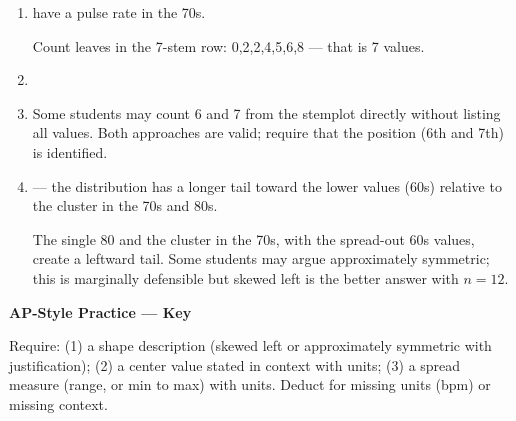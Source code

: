 \documentclass[10pt]{article}
\begin{document}
\begin{enumerate}[leftmargin=1.5em, itemsep=10pt]

  \item {} have a pulse rate in the 70s.

  \begin{teachernote}
  Count leaves in the 7-stem row: 0,2,2,4,5,6,8 — that is 7 values.
  \end{teachernote}

  \item {}

  \item {}

  \begin{teachernote}
  Some students may count 6 and 7 from the stemplot directly without listing
  all values. Both approaches are valid; require that the position (6th and 7th)
  is identified.
  \end{teachernote}

  \item {} --- the distribution has a longer tail toward the lower values
        (60s) relative to the cluster in the 70s and 80s.

  \begin{teachernote}
  The single 80 and the cluster in the 70s, with the spread-out 60s values, create
  a leftward tail. Some students may argue approximately symmetric; this is marginally
  defensible but skewed left is the better answer with $n=12$.
  \end{teachernote}

\end{enumerate}

\vspace{0.14in}

\begin{tcolorbox}[colback=redbg, colframe=redacc, boxrule=0.8pt, arc=2mm,
    left=4mm, right=4mm, top=3mm, bottom=3mm]
\small\textbf{AP-Style Practice --- Key}\\[8pt]

\vspace{8pt}
\begin{teachernote}
Require: (1) a shape description (skewed left or approximately symmetric with
justification); (2) a center value stated in context with units; (3) a spread
measure (range, or min to max) with units. Deduct for missing units (bpm) or
missing context.
\end{teachernote}
\end{tcolorbox}
\end{document}
